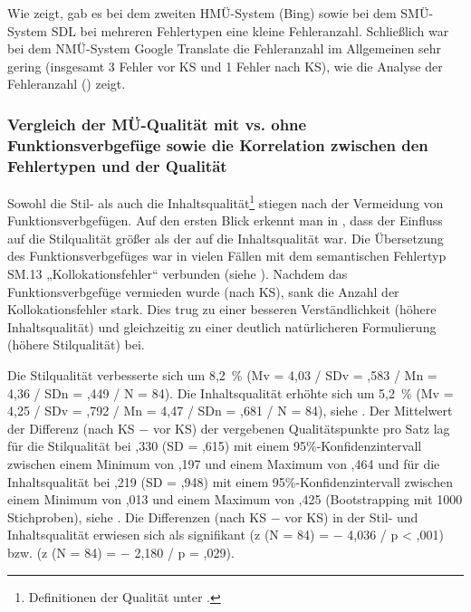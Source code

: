 Wie  zeigt, gab es bei dem zweiten HMÜ-System (Bing) sowie bei dem SMÜ-System SDL bei mehreren Fehlertypen eine kleine Fehleranzahl. Schließlich war bei dem NMÜ-System Google Translate die Fehleranzahl im Allgemeinen sehr gering (insgesamt 3 Fehler vor KS und 1 Fehler nach KS), wie die Analyse der Fehleranzahl () zeigt.



\subsubsection{\label{sec:5.3.2.4}Vergleich der MÜ-Qualität mit vs. ohne Funktionsverbgefüge sowie die Korrelation zwischen den Fehlertypen und der Qualität}

Sowohl die Stil- als auch die Inhaltsqualität\footnote{\textrm{Definitionen der Qualität unter .}} stiegen nach der Vermeidung von Funktionsverbgefügen. Auf den ersten Blick erkennt man in , dass der Einfluss auf die Stilqualität größer als der auf die Inhaltsqualität war. Die Übersetzung des Funktionsverbgefüges war in vielen Fällen mit dem semantischen Fehlertyp SM.13 „Kollokationsfehler“ verbunden (siehe ). Nachdem das Funktionsverbgefüge vermieden wurde (nach KS), sank die Anzahl der Kollokationsfehler stark. Dies trug zu einer besseren Verständlichkeit (höhere Inhaltsqualität) und gleichzeitig zu einer deutlich natürlicheren Formulierung (höhere Stilqualität) bei.

Die Stilqualität verbesserte sich um 8,2~\% (Mv = 4,03 / SDv = ,583 / Mn = 4,36 / SDn = ,449 / N = 84). Die Inhaltsqualität erhöhte sich um 5,2~\% (Mv = 4,25 / SDv = ,792 / Mn = 4,47 / SDn = ,681 / N = 84), siehe . Der Mittelwert der Differenz (nach KS $-$ vor KS) der vergebenen Qualitätspunkte pro Satz lag für die Stilqualität bei ,330 (SD = ,615) mit einem 95\%\nobreakdash-Konfidenzintervall zwischen einem Minimum von ,197 und einem Maximum von ,464 und für die Inhaltsqualität bei ,219 (SD = ,948) mit einem 95\%\nobreakdash-Konfidenzintervall zwischen einem Minimum von ,013 und einem Maximum von ,425 (Bootstrapping mit 1000 Stichproben), siehe . Die Differenzen (nach KS $-$ vor KS) in der Stil- und Inhaltsqualität erwiesen sich als signifikant (z (N = 84) = $-$ 4,036 / p < ,001) bzw. (z (N = 84) = $-$ 2,180 / p = ,029).







